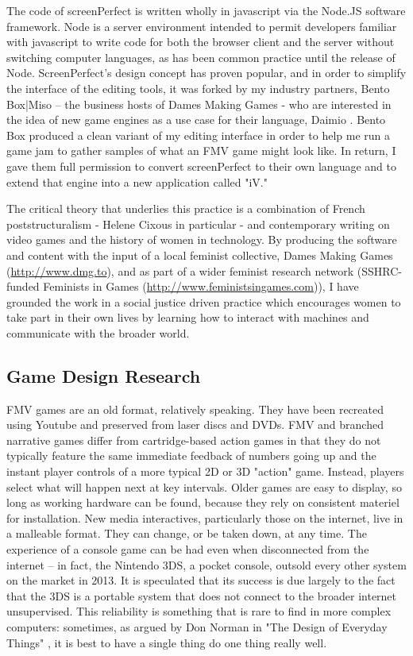 The code of screenPerfect is written wholly in javascript via the Node.JS software framework. Node is a server environment intended to permit developers familiar with javascript to write code for both the browser client and the server without switching computer languages, as has been common practice until the release of Node. ScreenPerfect's design concept has proven popular, and in order to simplify the interface of the editing tools, it was forked by my industry partners, Bento Box|Miso – the business hosts of Dames Making Games - who are interested in the idea of new game engines as a use case for their language, Daimio \parencite{daimio}. Bento Box produced a clean variant of my editing interface in order to help me run a game jam to gather samples of what an FMV game might look like. In return, I gave them full permission to convert screenPerfect to their own language and to extend that engine into a new application called "iV." 

The critical theory that underlies this practice is a combination of French poststructuralism - Helene Cixous in particular - and contemporary writing on video games and the history of women in technology. By producing the software and content with the input of a local feminist collective, Dames Making Games (\url{http://www.dmg.to}), and as part of a wider feminist research network (SSHRC-funded Feminists in Games (\url{http://www.feministsingames.com})), I have grounded the work in a social justice driven practice which encourages women to take part in their own lives by learning how to interact with machines and communicate with the broader world.

\subsection{Game Design Research}
FMV games are an old format, relatively speaking. They have been recreated using Youtube and preserved from laser discs and DVDs. FMV and branched narrative games differ from cartridge-based action games in that they do not typically feature the same immediate feedback of numbers going up and the instant player controls of a more typical 2D or 3D "action" game. Instead, players select what will happen next at key intervals. Older games are easy to display, so long as working hardware can be found, because they rely on consistent materiel for installation. New media interactives, particularly those on the internet, live in a malleable format. They can change, or be taken down, at any time. The experience of a console game can be had even when disconnected from the internet – in fact, the Nintendo 3DS, a pocket console, outsold every other system on the market in 2013. It is speculated that its success is due largely to the fact that the 3DS is a portable system that does not connect to the broader internet unsupervised. This reliability is something that is rare to find in more complex computers: sometimes, as argued by Don Norman in "The Design of Everyday Things" \parencite{norman}, it is best to have a single thing do one thing really well. 

